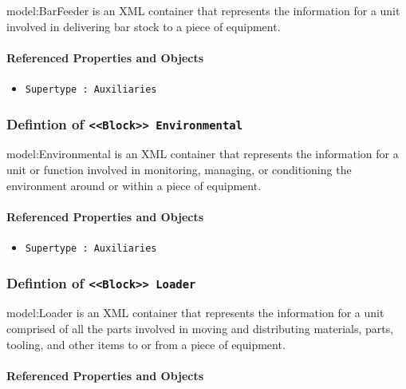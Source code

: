 \FloatBarrier

{model:BarFeeder} is an XML container that represents the information for a unit involved in delivering bar stock to a piece of equipment.

\FloatBarrier
\paragraph{Referenced Properties and Objects}

\begin{itemize}
\item \texttt{Supertype : Auxiliaries}

\end{itemize}
\FloatBarrier
\subsubsection{Defintion of \texttt{<<Block>> Environmental}}
  \label{type:Environmental}

\FloatBarrier

{model:Environmental} is an XML container that represents the information for a unit or function involved in monitoring, managing, or conditioning the environment around or within a piece of equipment.

\FloatBarrier
\paragraph{Referenced Properties and Objects}

\begin{itemize}
\item \texttt{Supertype : Auxiliaries}

\end{itemize}
\FloatBarrier
\subsubsection{Defintion of \texttt{<<Block>> Loader}}
  \label{type:Loader}

\FloatBarrier

{model:Loader} is an XML container that represents the information for a unit comprised of all the parts involved in moving and distributing materials, parts, tooling, and other items to or from a piece of equipment.

\FloatBarrier
\paragraph{Referenced Properties and Objects}

